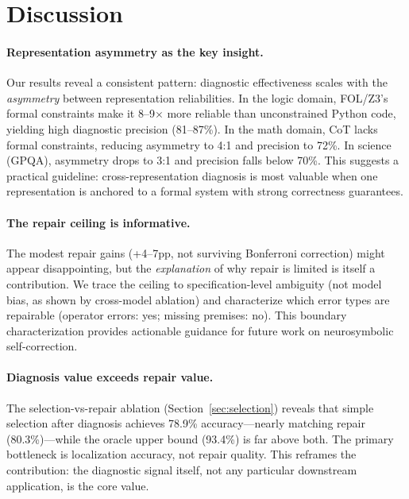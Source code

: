 \documentclass[11pt,a4paper]{article}
\begin{document}
\section{Discussion}
\label{sec:discussion}

\paragraph{Representation asymmetry as the key insight.}
Our results reveal a consistent pattern: diagnostic effectiveness scales with the \emph{asymmetry} between representation reliabilities. In the logic domain, FOL/Z3's formal constraints make it 8--9$\times$ more reliable than unconstrained Python code, yielding high diagnostic precision (81--87\%). In the math domain, CoT lacks formal constraints, reducing asymmetry to 4:1 and precision to 72\%. In science (GPQA), asymmetry drops to 3:1 and precision falls below 70\%. This suggests a practical guideline: cross-representation diagnosis is most valuable when one representation is anchored to a formal system with strong correctness guarantees.

\paragraph{The repair ceiling is informative.}
The modest repair gains (+4--7pp, not surviving Bonferroni correction) might appear disappointing, but the \emph{explanation} of why repair is limited is itself a contribution. We trace the ceiling to specification-level ambiguity (not model bias, as shown by cross-model ablation) and characterize which error types are repairable (operator errors: yes; missing premises: no). This boundary characterization provides actionable guidance for future work on neurosymbolic self-correction.

\paragraph{Diagnosis value exceeds repair value.}
The selection-vs-repair ablation (Section~\ref{sec:selection}) reveals that simple selection after diagnosis achieves 78.9\% accuracy---nearly matching repair (80.3\%)---while the oracle upper bound (93.4\%) is far above both. The primary bottleneck is localization accuracy, not repair quality. This reframes the contribution: the diagnostic signal itself, not any particular downstream application, is the core value.
\end{document}
